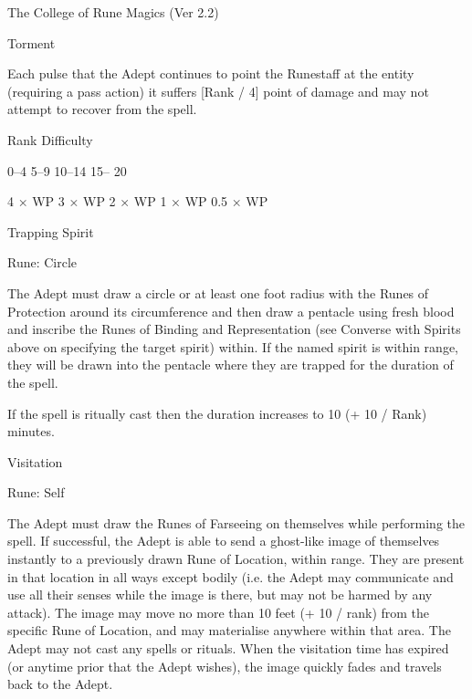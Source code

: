 \begin{Chapter}{The College of Rune Magics (Ver 2.2)}
\begin{spell}[S-14]{Torment }
\begin{effects}
Each pulse that the Adept continues to point the Runestaff at the
entity (requiring a pass action) it suffers [Rank / 4] point of damage
and may not attempt to recover from the spell.

Rank  Difficulty 

0–4 
5–9 
10–14 
15– 
20 

4 × WP 
3 × WP 
2 × WP 
1 × WP 
0.5 × WP 

\end{effects}
\end{spell}

\begin{spell}[S-15]{Trapping Spirit }

Rune: Circle 
\begin{effects}
The Adept must draw a circle or at least one foot radius with the
Runes of Protection around its circumference and then draw a pentacle
using fresh blood and inscribe the Runes of Binding and Representation
(see Converse with Spirits above on specifying the target spirit)
within. If the named spirit is within range, they will be drawn into
the pentacle where they are trapped for the duration of the spell.

If the spell is ritually cast then the duration increases to 10 (+ 10
/ Rank) minutes.
\end{effects}
\end{spell}

\begin{spell}[S-16]{Visitation }

Rune: Self 
\begin{effects}
The Adept must draw the Runes of Farseeing on themselves while
performing the spell. If successful, the Adept is able to send a
ghost-like image of themselves instantly to a previously drawn Rune of
Location, within range.  They are present in that location in all ways
except bodily (i.e.  the Adept may communicate and use all their
senses while the image is there, but may not be harmed by any attack).
The image may move no more than 10 feet (+ 10 / rank) from the
specific Rune of Location, and may materialise anywhere within that
area. The Adept may not cast any spells or rituals. When the
visitation time has expired (or anytime prior that the Adept wishes),
the image quickly fades and travels back to the Adept.
\end{effects}
\end{spell}


\end{Chapter}
